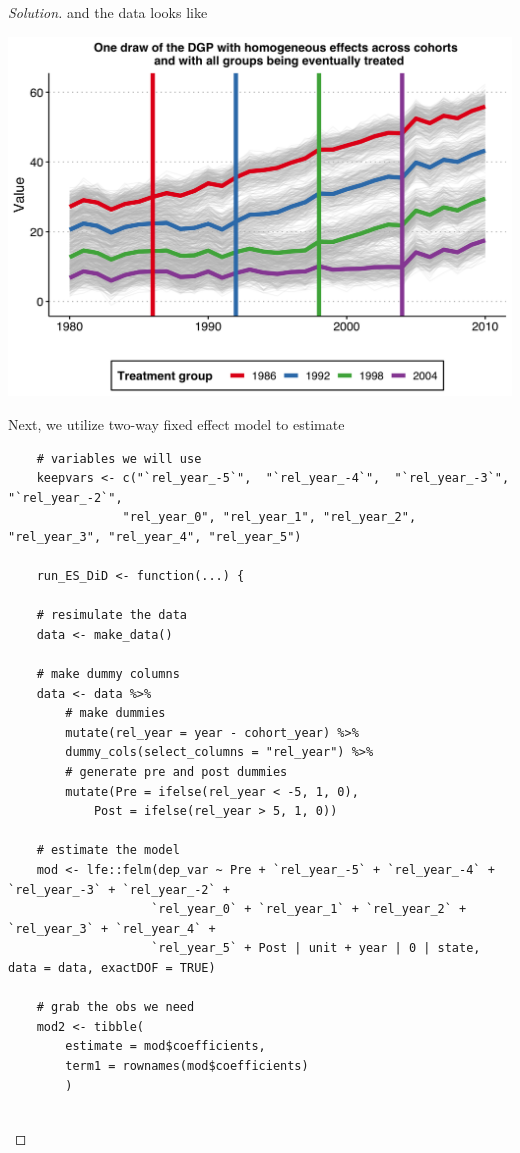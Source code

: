 \documentclass[11pt]{article}
\newenvironment{solution}{%
  \renewcommand\qedsymbol{$\blacksquare$}%
  \begin{mdframed}[backgroundcolor=gray!15]%
  \begin{proof}[Solution]}%
  {\end{proof}%
  \end{mdframed}}%
\begin{document}
\begin{enumerate}
\begin{solution}
            and the data looks like
            \begin{center}
                \includegraphics[scale = 0.3]{Q5b_TWFE.png}
            \end{center}

            Next, we utilize two-way fixed effect model to estimate

            \begin{lstlisting}
    # variables we will use
    keepvars <- c("`rel_year_-5`",  "`rel_year_-4`",  "`rel_year_-3`",  "`rel_year_-2`",
                "rel_year_0", "rel_year_1", "rel_year_2", "rel_year_3", "rel_year_4", "rel_year_5")

    run_ES_DiD <- function(...) {
    
    # resimulate the data
    data <- make_data()
    
    # make dummy columns
    data <- data %>% 
        # make dummies
        mutate(rel_year = year - cohort_year) %>% 
        dummy_cols(select_columns = "rel_year") %>% 
        # generate pre and post dummies
        mutate(Pre = ifelse(rel_year < -5, 1, 0),
            Post = ifelse(rel_year > 5, 1, 0))
    
    # estimate the model
    mod <- lfe::felm(dep_var ~ Pre + `rel_year_-5` + `rel_year_-4` + `rel_year_-3` + `rel_year_-2` + 
                    `rel_year_0` + `rel_year_1` + `rel_year_2` + `rel_year_3` + `rel_year_4` + 
                    `rel_year_5` + Post | unit + year | 0 | state, data = data, exactDOF = TRUE)
    
    # grab the obs we need
    mod2 <- tibble(
        estimate = mod$coefficients,
        term1 = rownames(mod$coefficients)
        )
    

\end{lstlisting}
\end{solution}
\end{enumerate}
\end{document}
